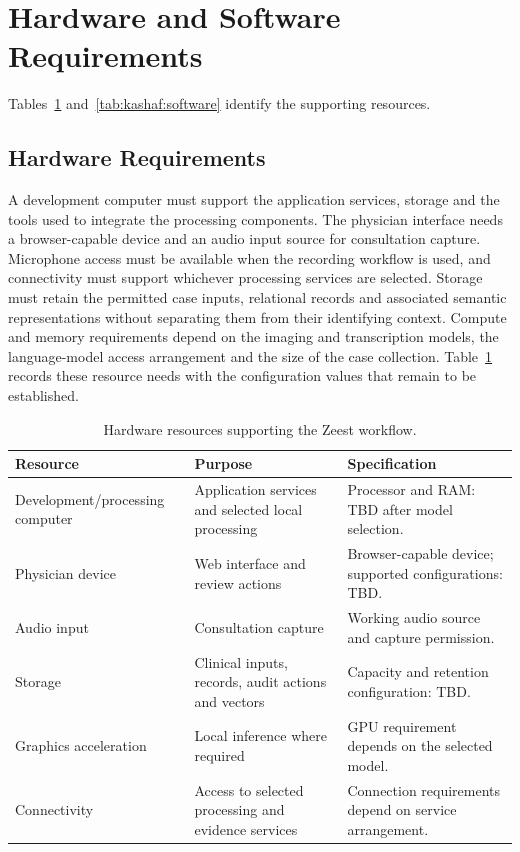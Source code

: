 \clearpage
\section{Hardware and Software Requirements}
Tables~\ref{tab:kashaf:hardware} and~\ref{tab:kashaf:software} identify the supporting resources.

\subsection{Hardware Requirements}
A development computer must support the application services, storage and the tools used to integrate the processing components. The physician interface needs a browser-capable device and an audio input source for consultation capture. Microphone access must be available when the recording workflow is used, and connectivity must support whichever processing services are selected. Storage must retain the permitted case inputs, relational records and associated semantic representations without separating them from their identifying context. Compute and memory requirements depend on the imaging and transcription models, the language-model access arrangement and the size of the case collection. Table~\ref{tab:kashaf:hardware} records these resource needs with the configuration values that remain to be established.

\begin{table}[htbp]
\centering
\small
\caption{Hardware resources supporting the Zeest workflow.}
\label{tab:kashaf:hardware}
\begin{tabular}{|p{}|p{}|p{}|}
\hline
Resource & Purpose & Specification \\ \hline
Development/processing computer & Application services and selected local processing & Processor and RAM: TBD after model selection. \\ \hline
Physician device & Web interface and review actions & Browser-capable device; supported configurations: TBD. \\ \hline
Audio input & Consultation capture & Working audio source and capture permission. \\ \hline
Storage & Clinical inputs, records, audit actions and vectors & Capacity and retention configuration: TBD. \\ \hline
Graphics acceleration & Local inference where required & GPU requirement depends on the selected model. \\ \hline
Connectivity & Access to selected processing and evidence services & Connection requirements depend on service arrangement. \\ \hline
\end{tabular}
\end{table}

